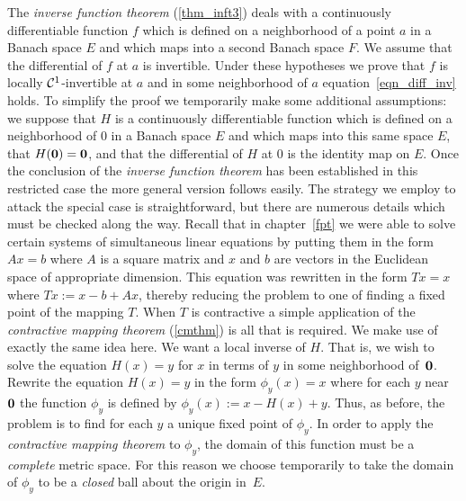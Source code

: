 The \emph{inverse function theorem} (\ref{thm_inft3}) deals with a continuously differentiable
function $f$ which is defined on a neighborhood of a point $a$ in a Banach space $E$ and which
maps into a second Banach space $F$.  We assume that the differential of $f$ at $a$ is
invertible.  Under these hypotheses we prove that $f$ is locally $\mathcal{C}^1$-invertible at $a$
and in some neighborhood of $a$ equation~\eqref{eqn_diff_inv} holds.  To simplify the proof we
temporarily make some additional assumptions: we suppose that $H$ is a continuously
differentiable function which is defined on a neighborhood of $0$ in a Banach space $E$ and
which maps into this same space $E$, that $H(\mathbf{0}) = \mathbf{0}$, and that the differential of $H$
at $0$ is the identity map on $E$.  Once the conclusion of the \emph{inverse function theorem}
has been established in this restricted case the more general version follows easily. The
strategy we employ to attack the special case is straightforward, but there are numerous
details which must be checked along the way.  Recall that in chapter~\ref{fpt} we were able to
solve certain systems of simultaneous linear equations by putting them in the form $Ax = b$
where $A$ is a square matrix and $x$ and $b$ are vectors in the Euclidean space of appropriate
dimension. This equation was rewritten in the form $Tx = x$ where $Tx := x - b + Ax$, thereby
reducing the problem to one of finding a fixed point of the mapping $T$. When $T$ is
contractive a simple application of the \emph{contractive mapping theorem} (\ref{cmthm}) is
all that is required. We make use of exactly the same idea here.  We want a local inverse of
$H$.  That is, we wish to solve the equation $H(x) = y$ for $x$ in terms of $y$ in some
neighborhood of~$\mathbf{0}$. Rewrite the equation $H(x) = y$ in the form $\phi_y(x) = x$ where for
each $y$ near $\mathbf{0}$ the function $\phi_y$ is defined by $\phi_y(x) := x - H(x) + y$.  Thus,
as before, the problem is to find for each $y$ a unique fixed point of $\phi_y$. In order to
apply the \emph{contractive mapping theorem} to $\phi_y$, the domain of this function must be
a \emph{complete} metric space. For this reason we choose temporarily to take the domain of
$\phi_y$ to be a \emph{closed} ball about the origin in~$E$.

